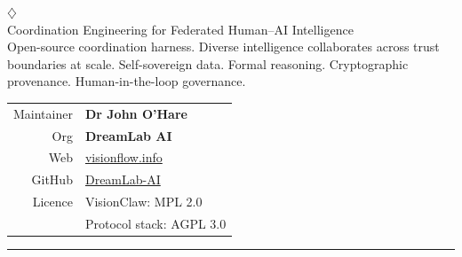 \documentclass[10pt,a4paper]{article}
\newcommand{\accentrule}{\textcolor{cyan}{\rule{\linewidth}{0.5pt}}}
\begin{document}

\vspace{-3mm}

\begin{minipage}[t]{0.60\linewidth}
  {\color{cyan}\Large$\diamondsuit$}\;\\[1pt]
  {\normalsize\color{gold}Coordination Engineering for Federated Human--AI Intelligence}\\[2pt]
  {\scriptsize\color{textmuted}Open-source coordination harness. Diverse intelligence collaborates across trust boundaries at scale. Self-sovereign data. Formal reasoning. Cryptographic provenance. Human-in-the-loop governance.}
\end{minipage}%
\hfill
\begin{minipage}[t]{0.36\linewidth}
  \raggedleft
  \vspace{1pt}
  {\tiny
  \begin{tabular}{r@{\;}l}
    \color{textmuted}Maintainer & \bfseries Dr John O'Hare \\
    \color{textmuted}Org & \bfseries DreamLab AI \\
    \color{textmuted}Web & \href{https://www.visionflow.info}{visionflow.info} \\
    \color{textmuted}GitHub & \href{https://github.com/DreamLab-AI}{DreamLab-AI} \\
    \color{textmuted}Licence & VisionClaw: MPL 2.0 \\
    & Protocol stack: AGPL 3.0 \\
  \end{tabular}}
\end{minipage}

\vspace{2pt}
\accentrule
\vspace{1pt}
\end{document}
